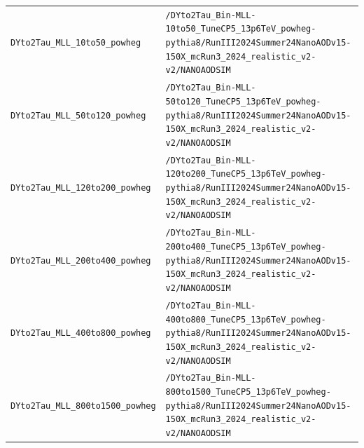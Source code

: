 \begin{longtable}{@{}>{\RaggedRight\arraybackslash}p{} >{\RaggedRight\arraybackslash}p{}@{}}
\addlinespace[2pt]
\texttt{DYto2Tau\_\allowbreak{}MLL\_\allowbreak{}10to50\_\allowbreak{}powheg} & \texttt{/\allowbreak{}DYto2Tau\_\allowbreak{}Bin-\allowbreak{}MLL-\allowbreak{}10to50\_\allowbreak{}TuneCP5\_\allowbreak{}13p6TeV\_\allowbreak{}powheg-\allowbreak{}pythia8/\allowbreak{}RunIII2024Summer24NanoAODv15-\allowbreak{}150X\_\allowbreak{}mcRun3\_\allowbreak{}2024\_\allowbreak{}realistic\_\allowbreak{}v2-\allowbreak{}v2/\allowbreak{}NANOAODSIM} \\
\addlinespace[2pt]
\texttt{DYto2Tau\_\allowbreak{}MLL\_\allowbreak{}50to120\_\allowbreak{}powheg} & \texttt{/\allowbreak{}DYto2Tau\_\allowbreak{}Bin-\allowbreak{}MLL-\allowbreak{}50to120\_\allowbreak{}TuneCP5\_\allowbreak{}13p6TeV\_\allowbreak{}powheg-\allowbreak{}pythia8/\allowbreak{}RunIII2024Summer24NanoAODv15-\allowbreak{}150X\_\allowbreak{}mcRun3\_\allowbreak{}2024\_\allowbreak{}realistic\_\allowbreak{}v2-\allowbreak{}v2/\allowbreak{}NANOAODSIM} \\
\addlinespace[2pt]
\texttt{DYto2Tau\_\allowbreak{}MLL\_\allowbreak{}120to200\_\allowbreak{}powheg} & \texttt{/\allowbreak{}DYto2Tau\_\allowbreak{}Bin-\allowbreak{}MLL-\allowbreak{}120to200\_\allowbreak{}TuneCP5\_\allowbreak{}13p6TeV\_\allowbreak{}powheg-\allowbreak{}pythia8/\allowbreak{}RunIII2024Summer24NanoAODv15-\allowbreak{}150X\_\allowbreak{}mcRun3\_\allowbreak{}2024\_\allowbreak{}realistic\_\allowbreak{}v2-\allowbreak{}v2/\allowbreak{}NANOAODSIM} \\
\addlinespace[2pt]
\texttt{DYto2Tau\_\allowbreak{}MLL\_\allowbreak{}200to400\_\allowbreak{}powheg} & \texttt{/\allowbreak{}DYto2Tau\_\allowbreak{}Bin-\allowbreak{}MLL-\allowbreak{}200to400\_\allowbreak{}TuneCP5\_\allowbreak{}13p6TeV\_\allowbreak{}powheg-\allowbreak{}pythia8/\allowbreak{}RunIII2024Summer24NanoAODv15-\allowbreak{}150X\_\allowbreak{}mcRun3\_\allowbreak{}2024\_\allowbreak{}realistic\_\allowbreak{}v2-\allowbreak{}v2/\allowbreak{}NANOAODSIM} \\
\addlinespace[2pt]
\texttt{DYto2Tau\_\allowbreak{}MLL\_\allowbreak{}400to800\_\allowbreak{}powheg} & \texttt{/\allowbreak{}DYto2Tau\_\allowbreak{}Bin-\allowbreak{}MLL-\allowbreak{}400to800\_\allowbreak{}TuneCP5\_\allowbreak{}13p6TeV\_\allowbreak{}powheg-\allowbreak{}pythia8/\allowbreak{}RunIII2024Summer24NanoAODv15-\allowbreak{}150X\_\allowbreak{}mcRun3\_\allowbreak{}2024\_\allowbreak{}realistic\_\allowbreak{}v2-\allowbreak{}v2/\allowbreak{}NANOAODSIM} \\
\addlinespace[2pt]
\texttt{DYto2Tau\_\allowbreak{}MLL\_\allowbreak{}800to1500\_\allowbreak{}powheg} & \texttt{/\allowbreak{}DYto2Tau\_\allowbreak{}Bin-\allowbreak{}MLL-\allowbreak{}800to1500\_\allowbreak{}TuneCP5\_\allowbreak{}13p6TeV\_\allowbreak{}powheg-\allowbreak{}pythia8/\allowbreak{}RunIII2024Summer24NanoAODv15-\allowbreak{}150X\_\allowbreak{}mcRun3\_\allowbreak{}2024\_\allowbreak{}realistic\_\allowbreak{}v2-\allowbreak{}v2/\allowbreak{}NANOAODSIM} \\

\end{longtable}
